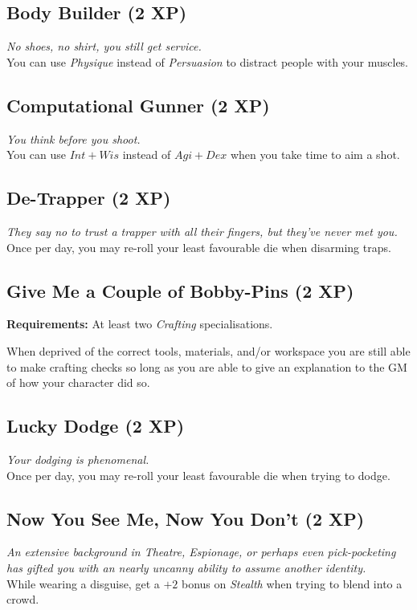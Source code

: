 \subsection{Body Builder (2 XP)}
\textit{No shoes, no shirt, you still get service.}\\
You can use \textit{Physique} instead of \textit{Persuasion} to distract people with your muscles.

\subsection{Computational Gunner (2 XP)}
\textit{You think before you shoot.}\\
You can use $Int+Wis$ instead of $Agi+Dex$ when you take time to aim a shot.

\subsection{De-Trapper (2 XP)}
\textit{They say no to trust a trapper with all their fingers, but they've never met you.}\\
Once per day, you may re-roll your least favourable die when disarming traps.

\subsection{Give Me a Couple of Bobby-Pins (2 XP)}
\textbf{Requirements:} At least two \textit{Crafting} specialisations.

When deprived of the correct tools, materials, and/or workspace you are still able to make crafting checks so long as you are able to give an explanation to the GM of how your character did so.

\subsection{Lucky Dodge (2 XP)}
\textit{Your dodging is phenomenal.}\\
Once per day, you may re-roll your least favourable die when trying to dodge.

\subsection{Now You See Me, Now You Don't (2 XP)}
\textit{An extensive background in Theatre, Espionage, or perhaps even pick-pocketing has gifted you with an nearly uncanny ability to assume another identity.}\\
While wearing a disguise, get a $+2$ bonus on \textit{Stealth} when trying to blend into a crowd.

